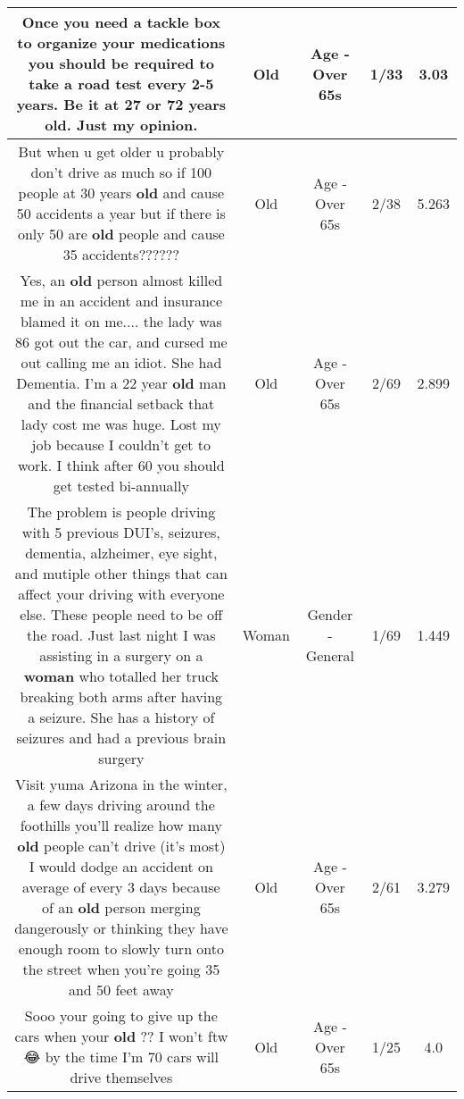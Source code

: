 \documentclass[11pt]{article}
\newlength\mylength
\begin{document}
\begin{center}
\begin{longtable}{|C{.65\mylength}|C{.30\mylength}|C{.12\mylength}|C{.12\mylength}|C{.12\mylength}|}
  \small Once you need a tackle box to organize your medications you should be required to take a road test every 2-5 years. Be it at 27 or 72 years \textbf{old}. Just my opinion.\normalsize   & Old & Age - Over 65s & 1/33 & 3.03 \\  \hline
  \small But when u get older u probably don't drive as much so if 100 people at 30 years \textbf{old} and cause 50 accidents a year but if there is only 50  are \textbf{old} people and cause 35 accidents??????\normalsize   & Old & Age - Over 65s & 2/38 & 5.263 \\  \hline
  \small Yes, an \textbf{old} person almost killed me in an accident and insurance blamed it on me.... the lady was 86 got out the car, and cursed me out calling me an idiot. She had Dementia. I'm a 22 year \textbf{old} man and the financial setback that lady cost me was huge. Lost my job because I couldn't get to work. I think after 60 you should get tested bi-annually\normalsize   & Old & Age - Over 65s & 2/69 & 2.899 \\  \hline
  \small The problem is people driving with 5 previous DUI's, seizures, dementia, alzheimer, eye sight, and mutiple other things that can affect your driving with everyone else. These people need to be off the road. Just last night I was assisting in a surgery on a \textbf{woman} who totalled her truck breaking both arms after having a seizure. She has a history of seizures and had a previous brain surgery\normalsize   & Woman & Gender - General & 1/69 & 1.449 \\  \hline
  \small Visit yuma Arizona in the winter, a few days driving around the foothills you'll realize how many \textbf{old} people can't drive (it's most) I would dodge an accident on average of every 3 days because of an \textbf{old} person merging dangerously or thinking they have enough room to slowly turn onto the street when you're going 35 and 50 feet away\normalsize   & Old & Age - Over 65s & 2/61 & 3.279 \\  \hline
  \small Sooo your going to give up the cars when your \textbf{old} ?? I won't ftw 😂 by the time I'm 70 cars will drive themselves\normalsize   & Old & Age - Over 65s & 1/25 & 4.0 \\  \hline

\end{longtable}
\end{center}
\end{document}
